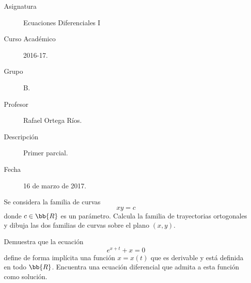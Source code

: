 \documentclass[12pt]{article}
\begin{document}

    
    

    \begin{description}
        \item[Asignatura] Ecuaciones Diferenciales I
        \item[Curso Académico] 2016-17.
        \item[Grupo] B.
        \item[Profesor] Rafael Ortega Ríos.
        \item[Descripción] Primer parcial.
        \item[Fecha] 16 de marzo de 2017.
    
    \end{description}
    \newpage

    \begin{ejercicio}
        Se considera la familia de curvas
        \begin{equation*}
            xy = c
        \end{equation*}
        donde $c \in \bb{R}$ es un parámetro. Calcula la familia de trayectorias ortogonales y dibuja las dos familias de curvas sobre el plano $(x, y)$.
    \end{ejercicio}

    \begin{ejercicio}
        Demuestra que la ecuación
        \begin{equation*}
            e^{x+t} + x = 0
        \end{equation*}
        define de forma implícita una función $x = x(t)$ que es derivable y está definida en todo $\bb{R}$. Encuentra una ecuación diferencial que admita a esta función como solución.
    \end{ejercicio}
\end{document}
